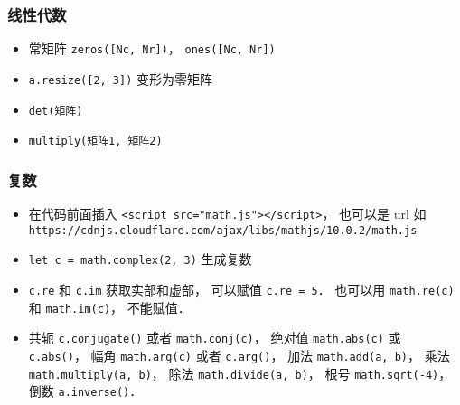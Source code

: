 \subsubsection{线性代数}
\begin{itemize}
\item 常矩阵 \verb|zeros([Nc, Nr])|， \verb|ones([Nc, Nr])|
\item \verb|a.resize([2, 3])| 变形为零矩阵
\item \verb|det(矩阵)|
\item \verb|multiply(矩阵1, 矩阵2)|
\end{itemize}

\subsubsection{复数}
\begin{itemize}
\item 在代码前面插入 \verb|<script src="math.js"></script>|， 也可以是 url 如 \verb|https://cdnjs.cloudflare.com/ajax/libs/mathjs/10.0.2/math.js|
\item \verb|let c = math.complex(2, 3)| 生成复数
\item \verb|c.re| 和 \verb|c.im| 获取实部和虚部， 可以赋值 \verb|c.re = 5|． 也可以用 \verb|math.re(c)| 和 \verb|math.im(c)|， 不能赋值．
\item 共轭 \verb|c.conjugate()| 或者 \verb|math.conj(c)|， 绝对值 \verb|math.abs(c)| 或 \verb|c.abs()|， 幅角 \verb|math.arg(c)| 或者 \verb|c.arg()|， 加法 \verb|math.add(a, b)|， 乘法 \verb|math.multiply(a, b)|， 除法 \verb|math.divide(a, b)|， 根号 \verb|math.sqrt(-4)|， 倒数 \verb|a.inverse()|．
\end{itemize}
